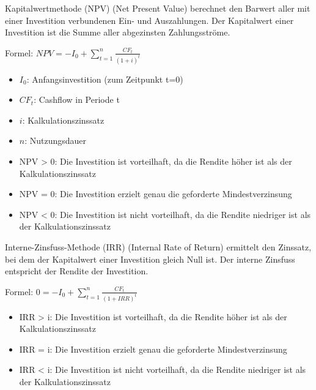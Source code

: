 \begin{definition}{Kapitalwertmethode (NPV)} (Net Present Value) berechnet den Barwert aller mit einer Investition verbundenen Ein- und Auszahlungen. Der Kapitalwert einer Investition ist die Summe aller abgezinsten Zahlungsströme.

Formel: $NPV = -I_0 + \sum_{t=1}^{n} \frac{CF_t}{(1 + i)^t}$
\begin{itemize}
    \item $I_0$: Anfangsinvestition (zum Zeitpunkt t=0)
    \item $CF_t$: Cashflow in Periode t
    \item $i$: Kalkulationszinssatz
    \item $n$: Nutzungsdauer
\end{itemize}
\begin{itemize}
    \item NPV > 0: Die Investition ist vorteilhaft, da die Rendite höher ist als der Kalkulationszinssatz
    \item NPV = 0: Die Investition erzielt genau die geforderte Mindestverzinsung
    \item NPV < 0: Die Investition ist nicht vorteilhaft, da die Rendite niedriger ist als der Kalkulationszinssatz
\end{itemize}
\end{definition}


\begin{definition}{Interne-Zinsfuss-Methode (IRR)} 
(Internal Rate of Return) ermittelt den Zinssatz, bei dem der Kapitalwert einer Investition gleich Null ist. Der interne Zinsfuss entspricht der Rendite der Investition.

Formel: $0 = -I_0 + \sum_{t=1}^{n} \frac{CF_t}{(1 + IRR)^t}$
\begin{itemize}
    \item IRR > i: Die Investition ist vorteilhaft, da die Rendite höher ist als der Kalkulationszinssatz
    \item IRR = i: Die Investition erzielt genau die geforderte Mindestverzinsung
    \item IRR < i: Die Investition ist nicht vorteilhaft, da die Rendite niedriger ist als der Kalkulationszinssatz
\end{itemize}
\end{definition}

